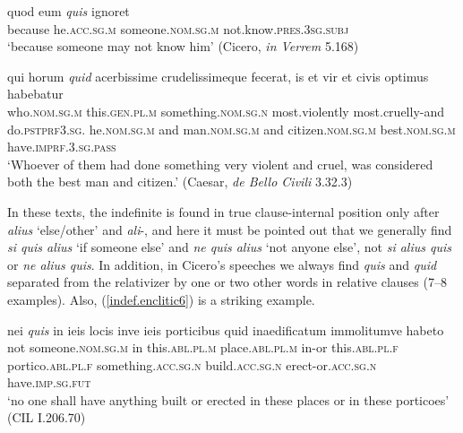 \begin{exe}
\ex
\gll quod eum \emph{quis} ignoret\\
because he.\textsc{acc.sg.m} someone.\textsc{nom.sg.m} not.know.\textsc{pres.3sg.subj}\\ 
\trans `because someone may not know him' (Cicero, \textit{in Verrem} 5.168) 
\label{indef.enclitic4}
\end{exe}

\begin{exe}
\ex
\gll qui horum \emph{quid} acerbissime crudelissimeque fecerat, is et vir et civis optimus habebatur\\
who.\textsc{nom.sg.m} this.\textsc{gen.pl.m} something.\textsc{nom.sg.n} most.violently most.cruelly-and do.\textsc{pstprf3.sg.} he.\textsc{nom.sg.m} and man.\textsc{nom.sg.m} and citizen.\textsc{nom.sg.m} best.\textsc{nom.sg.m} have.\textsc{imprf.3.sg.pass}\\
\trans `Whoever of them had done something very violent and cruel, was considered both the best man and citizen.' (Caesar, \textit{de Bello Civili} 3.32.3) 
\label{indef.enclitic5}
\end{exe}


In these texts, the indefinite is found in true clause-internal position only after \emph{alius} `else/other' and \emph{ali}-, and here it must be pointed out that we generally find \emph{si quis alius} `if someone else' and \emph{ne quis alius} `not anyone else', not \emph{si alius quis} or \emph{ne alius quis}. In addition, in Cicero's speeches we always find \emph{quis} and \emph{quid} separated from the relativizer by one or two other words in relative clauses (7--8 examples). Also, (\ref{indef.enclitic6}) is a striking example.

\begin{exe}
\ex
\gll nei \emph{quis} in ieis locis inve ieis porticibus quid inaedificatum immolitumve habeto\\
not someone.\textsc{nom.sg.m} in this.\textsc{abl.pl.m} place.\textsc{abl.pl.m} in-or this.\textsc{abl.pl.f} portico.\textsc{abl.pl.f} something.\textsc{acc.sg.n} build.\textsc{acc.sg.n} erect-or.\textsc{acc.sg.n} have.\textsc{imp.sg.fut}\\
\trans `no one shall have anything built or erected in these places or in these porticoes' (CIL I.206.70) 
\label{indef.enclitic6}
\end{exe}

